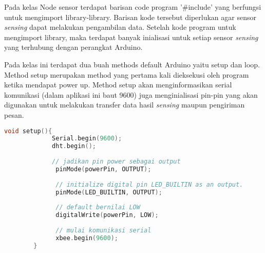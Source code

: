    Pada kelas Node sensor terdapat barisan code program '\#include' yang berfungsi untuk mengimport library-library. Barisan kode tersebut diperlukan agar sensor \textit{sensing} dapat melakukan pengambilan data. Setelah kode program untuk mengimport library, maka terdapat banyak inialisasi untuk setiap sensor \textit{sensing} yang terhubung dengan perangkat Arduino.
   
   Pada kelas ini terdapat dua buah methods default Arduino yaitu setup dan loop. Method setup merupakan method yang pertama kali dieksekusi oleh program ketika mendapat power up. Method setup akan menginformasikan serial komunikasi (dalam aplikasi ini baut 9600) juga menginialisasi pin-pin yang akan digunakan untuk melakukan transfer data hasil \textit{sensing} maupun pengiriman pesan. 
   
   
   \begin{lstlisting}[label=setup, language=C, caption=Metode setup(), numbers=none]
        void setup(){
             Serial.begin(9600);
             dht.begin();
            
             // jadikan pin power sebagai output
              pinMode(powerPin, OUTPUT);
            
              // initialize digital pin LED_BUILTIN as an output.
              pinMode(LED_BUILTIN, OUTPUT);
               
              // default bernilai LOW
              digitalWrite(powerPin, LOW);
            
              // mulai komunikasi serial
              xbee.begin(9600);
        }
    \end{lstlisting}

